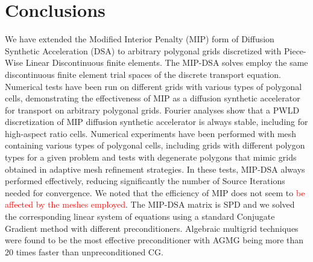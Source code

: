 \section{Conclusions} \label{sec_conc}
We have extended the Modified Interior Penalty (MIP) form of Diffusion Synthetic Acceleration (DSA) 
to arbitrary polygonal grids discretized with Piece-Wise Linear Discontinuous finite elements. 
The MIP-DSA solves employ the same discontinuous finite element trial spaces of the discrete \sn
transport equation.
%
Numerical tests have been run on different grids with various types of polygonal cells,
demonstrating the effectiveness of MIP as a diffusion synthetic accelerator for 
\sn transport on arbitrary polygonal grids.
%
%
Fourier analyses show that a PWLD discretization of MIP diffusion synthetic accelerator 
is always stable, including for high-aspect ratio cells. 
%
Numerical experiments have been performed with mesh containing various types of polygonal cells, including
grids with different polygon types for a given problem and tests with degenerate polygons that mimic
grids obtained in adaptive mesh refinement strategies. In these tests, MIP-DSA always performed effectively,
reducing significantly the number of Source Iterations needed for convergence. 
We noted that the efficiency of MIP does not seem to \textcolor{red}{be affected by the meshes employed}. 
%
The MIP-DSA  matrix is SPD and we solved the corresponding linear system of equations using a standard Conjugate
Gradient method with different preconditioners. 
Algebraic multigrid techniques were found to be the most effective preconditioner with AGMG being more than 20 times
faster than unpreconditioned CG.

